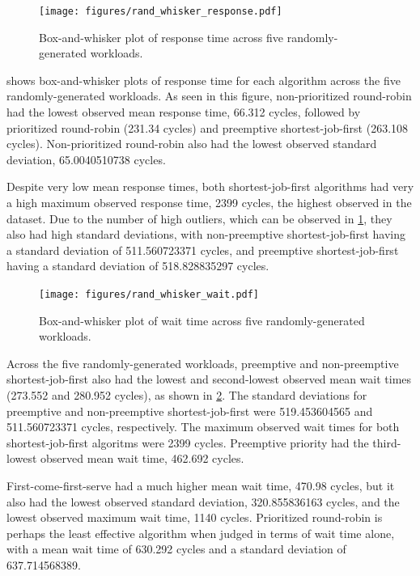 \documentclass[12pt,letterpaper]{article}
\begin{document}
			\begin{figure}[H]
				\centerline{\texttt{[image: figures/rand\_whisker\_response.pdf]}}
				\caption{Box-and-whisker plot of response time across five randomly-generated workloads.}
				\label{fig:rand_whisker_response}
			\end{figure}

			 shows box-and-whisker plots of response time for each algorithm across the five randomly-generated workloads. As seen in this figure, non-prioritized round-robin had the lowest observed mean response time, 66.312 cycles, followed by prioritized round-robin (231.34 cycles) and preemptive shortest-job-first (263.108 cycles). Non-prioritized round-robin also had the lowest observed standard deviation, 65.0040510738 cycles.

			Despite very low mean response times, both shortest-job-first algorithms had very a high maximum observed response time, 2399 cycles, the highest observed in the dataset. Due to the number of high outliers, which can be observed in \cref{fig:rand_whisker_response}, they also had high standard deviations, with non-preemptive shortest-job-first having a standard deviation of 511.560723371 cycles, and preemptive shortest-job-first having a standard deviation of 518.828835297 cycles.

			\begin{figure}[H]
				\centerline{\texttt{[image: figures/rand\_whisker\_wait.pdf]}}
				\caption{Box-and-whisker plot of wait time across five randomly-generated workloads.}
				\label{fig:rand_whisker_wait}
			\end{figure}

			Across the five randomly-generated workloads, preemptive and non-preemptive shortest-job-first also had the lowest and second-lowest observed mean wait times (273.552 and 280.952 cycles), as shown in \cref{fig:rand_whisker_wait}. The standard deviations for preemptive and non-preemptive shortest-job-first were 519.453604565 and 511.560723371 cycles, respectively. The maximum observed wait times for both shortest-job-first algoritms were 2399 cycles. Preemptive priority had the third-lowest observed mean wait time, 462.692 cycles. 

			First-come-first-serve had a much higher mean wait time, 470.98 cycles, but it also had the lowest observed standard deviation, 320.855836163 cycles, and the lowest observed maximum wait time, 1140 cycles. Prioritized round-robin is perhaps the least effective algorithm when judged in terms of wait time alone, with a mean wait time of 630.292 cycles and a standard deviation of 637.714568389.
\end{document}

